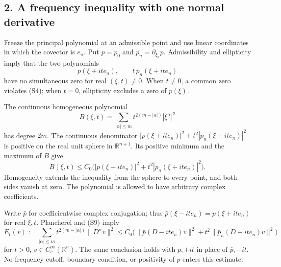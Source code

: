 \documentclass[
  11pt,
]{article}
\makeatletter
\let\ReaderOriginalAnchorStart\hyper@anchorstart
\let\ReaderOriginalAnchorEnd\hyper@anchorend
\let\ReaderPendingAliases\@empty
\def\ReaderArmAliases#1{\gdef\ReaderPendingAliases{#1}}
\def\hyper@anchorstart#1{\ReaderIfNativeAnchorTF{#1}{\ReaderPendingAliases\global\let\ReaderPendingAliases\@empty}{}\ReaderOriginalAnchorStart{#1}}
\makeatother
\begin{document}
\subsection{2. A frequency inequality with one normal
derivative}\label{a-frequency-inequality-with-one-normal-derivative}

Freeze the principal polynomial at an admissible point and use linear
coordinates in which the covector is \(e_n\). Put \(p=p_0\) and
\(p_n=\partial_{\xi_n}p\). Admissibility and ellipticity imply that the
two polynomials \[
 p(\xi+it e_n),\qquad t\,p_n(\xi+it e_n)
\] have no simultaneous zero for real \((\xi,t)\ne0\). When \(t\ne0\), a
common zero violates (S4); when \(t=0\), ellipticity excludes a zero of
\(p(\xi)\).

The continuous homogeneous polynomial \[
 B(\xi,t)=\sum_{|\alpha|\leq m}t^{2(m-|\alpha|)}|\xi^\alpha|^2
\] has degree \(2m\). The continuous denominator
\(|p(\xi+it e_n)|^2+t^2|p_n(\xi+it e_n)|^2\) is positive on the real
unit sphere in \(\mathbb R^{n+1}\). Its positive minimum and the maximum
of \(B\) give \[
 B(\xi,t)\leq C_0\bigl(|p(\xi+it e_n)|^2+
                   t^2|p_n(\xi+it e_n)|^2\bigr).                 \tag{S9}
\] Homogeneity extends the inequality from the sphere to every point,
and both sides vanish at zero. The polynomial is allowed to have
arbitrary complex coefficients.

Write \(\bar p\) for coefficientwise complex conjugation; thus
\(\bar p(\xi-it e_n)=\overline{p(\xi+it e_n)}\) for real \(\xi,t\).
Plancherel and (S9) imply \[
 E_t(v):=\sum_{|\alpha|\leq m}t^{2(m-|\alpha|)}\|D^\alpha v\|^2
 \leq C_0\bigl(\|\bar p(D-it e_n)v\|^2+
          t^2\|\bar p_n(D-it e_n)v\|^2\bigr)                      \tag{S10}
\] for \(t>0\), \(v\in C_c^\infty(\mathbb R^n)\). The same conclusion
holds with \(p,+it\) in place of \(\bar p,-it\). No frequency cutoff,
boundary condition, or positivity of \(p\) enters this estimate.

\ReaderArmAliases{\ReaderOriginalAnchorStart{AN03-SUC-003}\ReaderOriginalAnchorEnd\begingroup\expandafter\def\csname @currentHref\endcsname{AN03-SUC-003}\label{AN03-SUC-003}\endgroup\ReaderOriginalAnchorStart{an03-suc-003-a-finite-norm-identity-for-a-signed-quadratic-weight}\ReaderOriginalAnchorEnd\begingroup\expandafter\def\csname @currentHref\endcsname{an03-suc-003-a-finite-norm-identity-for-a-signed-quadratic-weight}\label{an03-suc-003-a-finite-norm-identity-for-a-signed-quadratic-weight}\endgroup\ReaderOriginalAnchorStart{3-a-finite-norm-identity-for-a-signed-quadratic-weight}\ReaderOriginalAnchorEnd\begingroup\expandafter\def\csname @currentHref\endcsname{3-a-finite-norm-identity-for-a-signed-quadratic-weight}\label{3-a-finite-norm-identity-for-a-signed-quadratic-weight}\endgroup\ReaderOriginalAnchorStart{a-finite-norm-identity-for-a-signed-quadratic-weight}\ReaderOriginalAnchorEnd}
\end{document}
